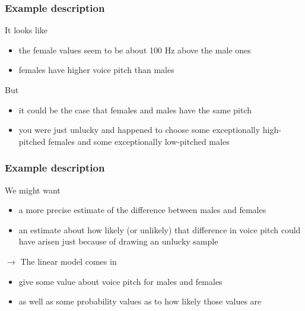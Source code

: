 \documentclass[10p]{beamer}\usepackage[]{graphicx}\usepackage[]{color}
\begin{document}
\begin{frame}
\frametitle{Example description}
It looks like
\begin{itemize}
\item the female values seem to be about 100 Hz above the male ones
\item females have higher voice pitch than males
\end{itemize}

\vspace{9pt}
But
\begin{itemize}
\item it could be the case that females and males have the same pitch
\item you were just unlucky and happened to choose some exceptionally high-pitched females and some exceptionally low-pitched males
\end{itemize}
\end{frame}

\begin{frame}
\frametitle{Example description}
We might want
\begin{itemize}
\item a more precise estimate of the difference between males and females
\item an estimate about how likely (or unlikely) that difference in voice pitch could have arisen just because of drawing an unlucky sample
\end{itemize}

$\rightarrow$ \alert{The linear model} comes in
\begin{itemize}
\item give some value about voice pitch for males and females
\item as well as \alert{some probability values} as to how likely those values are
\end{itemize}
\end{frame}
\end{document}
